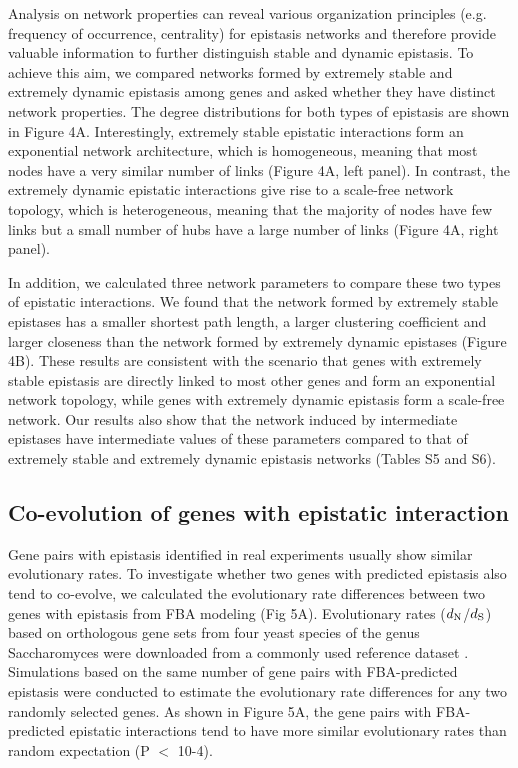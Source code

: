 Analysis on network properties can reveal various organization
principles (e.g. frequency of occurrence, centrality) for epistasis
networks \citep{Tong2004, Costanzo2010} and therefore provide valuable
information to further
distinguish stable and dynamic epistasis. To achieve this aim, we
compared networks formed by extremely stable and extremely dynamic
epistasis among genes and asked whether they have distinct network
properties. The degree distributions for both types of epistasis are
shown in Figure 4A. Interestingly, extremely stable epistatic
interactions form an exponential network architecture, which is
homogeneous, meaning that most nodes have a very similar number of
links (Figure 4A, left panel). In contrast, the extremely dynamic
epistatic interactions give rise to a scale-free network topology,
which is heterogeneous, meaning that the majority of nodes have few
links but a small number of hubs have a large number of links (Figure
4A, right panel).

In addition, we calculated three network parameters to compare these
two types of epistatic interactions. We found that the network formed
by extremely stable epistases has a smaller shortest path length, a
larger clustering coefficient and larger closeness than the network
formed by extremely dynamic epistases (Figure 4B). These results are
consistent with the scenario that genes with extremely stable
epistasis are directly linked to most other genes and form an
exponential network topology, while genes with extremely dynamic
epistasis form a scale-free network. Our results also show that the
network induced by intermediate epistases have intermediate values of
these parameters compared to that of extremely stable and extremely
dynamic epistasis networks (Tables S5 and S6).

\subsection{Co-evolution of genes with epistatic interaction}

Gene pairs with epistasis identified in real experiments usually show
similar evolutionary rates. To investigate whether two genes with
predicted epistasis also tend to co-evolve, we calculated the
evolutionary rate differences between two genes with epistasis from
FBA modeling (Fig 5A). Evolutionary rates
($d_\textnormal{N}$/$d_\textnormal{S}$) based on orthologous gene sets
from four yeast species of the genus Saccharomyces were downloaded
from a commonly used reference dataset \citep{Wall2005}. Simulations
based on the same number of gene pairs with FBA-predicted epistasis
were conducted to estimate the evolutionary rate differences for any
two randomly selected genes. As shown in Figure 5A, the gene pairs
with FBA-predicted epistatic interactions tend to have more similar
evolutionary rates than random expectation (P $<$ 10-4).

